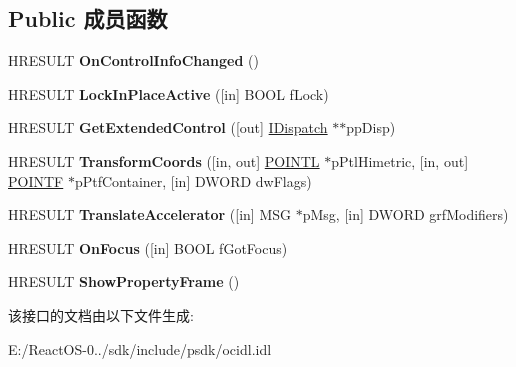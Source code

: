 \subsection*{Public 成员函数}
\begin{DoxyCompactItemize}
\item 
\mbox{\label{interface_i_ole_control_site_a83fd4f1eeccddccd67bca573cd74ae8d}} 
H\+R\+E\+S\+U\+LT {\bfseries On\+Control\+Info\+Changed} ()
\item 
\mbox{\label{interface_i_ole_control_site_aa11bab1404ec7e51301616384fffa84a}} 
H\+R\+E\+S\+U\+LT {\bfseries Lock\+In\+Place\+Active} (\mbox{[}in\mbox{]} B\+O\+OL f\+Lock)
\item 
\mbox{\label{interface_i_ole_control_site_a506783b428861ca2fb29ea3dc51a7cba}} 
H\+R\+E\+S\+U\+LT {\bfseries Get\+Extended\+Control} (\mbox{[}out\mbox{]} \hyperlink{interface_i_dispatch}{I\+Dispatch} $\ast$$\ast$pp\+Disp)
\item 
\mbox{\label{interface_i_ole_control_site_a20682dcf1e622edb926851fc28434f04}} 
H\+R\+E\+S\+U\+LT {\bfseries Transform\+Coords} (\mbox{[}in, out\mbox{]} \hyperlink{struct___p_o_i_n_t_l}{P\+O\+I\+N\+TL} $\ast$p\+Ptl\+Himetric, \mbox{[}in, out\mbox{]} \hyperlink{struct_i_ole_control_site_1_1tag_p_o_i_n_t_f}{P\+O\+I\+N\+TF} $\ast$p\+Ptf\+Container, \mbox{[}in\mbox{]} D\+W\+O\+RD dw\+Flags)
\item 
\mbox{\label{interface_i_ole_control_site_a7e55b77a27d5d00c035812b4f51910f9}} 
H\+R\+E\+S\+U\+LT {\bfseries Translate\+Accelerator} (\mbox{[}in\mbox{]} M\+SG $\ast$p\+Msg, \mbox{[}in\mbox{]} D\+W\+O\+RD grf\+Modifiers)
\item 
\mbox{\label{interface_i_ole_control_site_a18dfe2823029a8492c87cbda2606ec14}} 
H\+R\+E\+S\+U\+LT {\bfseries On\+Focus} (\mbox{[}in\mbox{]} B\+O\+OL f\+Got\+Focus)
\item 
\mbox{\label{interface_i_ole_control_site_ab136c711aabca6177b0b2a9c523d9af2}} 
H\+R\+E\+S\+U\+LT {\bfseries Show\+Property\+Frame} ()
\end{DoxyCompactItemize}


该接口的文档由以下文件生成\+:\begin{DoxyCompactItemize}
\item 
E\+:/\+React\+O\+S-\/0../sdk/include/psdk/ocidl.\+idl\end{DoxyCompactItemize}
